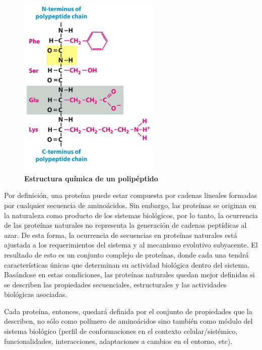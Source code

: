 \begin{figure}[htbp,centered]
\centering
\includegraphics[width=0.6\textwidth]{img/polipeptidoStructure.jpg} 
\caption{\textbf{Estructura química de un polipéptido}} 
\label{polipeptidoEstructura}
\end{figure}



Por definición, una proteína puede estar compuesta por cadenas lineales formadas por cualquier secuencia de aminoácidos.
Sin embargo, las proteínas se originan en la naturaleza como producto de los sistemas biológicos, por lo tanto, 
la ocurrencia de las proteínas naturales no representa la generación de cadenas peptídicas al azar. 
De esta forma, la ocurrencia de secuencias en proteínas naturales está ajustada a los requerimientos del sistema y al mecanismo evolutivo subyacente. 
El resultado de esto es un conjunto complejo de proteínas, donde cada una tendrá características únicas que determinan su actividad biológica dentro del sistema.
Basándose en estas condiciones, las proteínas naturales quedan mejor definidas si se describen las propiedades secuenciales, estructurales y las actividades biológicas asociadas. 

Cada proteína, entonces, quedará definida por el conjunto de propiedades que la describen, no sólo como polímero de aminoácidos 
sino también como módulo del sistema biológico (perfil de conformaciones en el contexto celular/sistémico, funcionalidades, interacciones, adaptaciones a cambios en el entorno, etc). 

